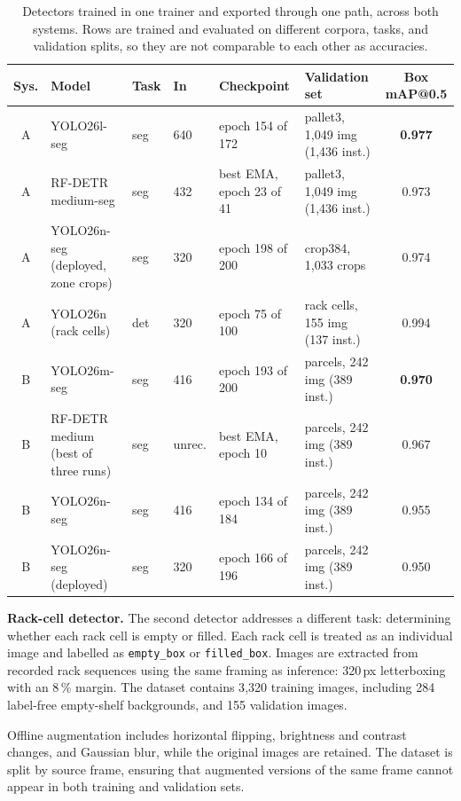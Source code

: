 \documentclass[9pt,a4paper,twocolumn]{rho-class/rho}
\begin{document}
\begin{table}[tbp]
    \caption{Detectors trained in one trainer and exported through one path, across both systems. Rows are trained and evaluated on different corpora, tasks, and validation splits, so they are not comparable to each other as accuracies.}
    \label{tab:detectors}
    \centering
    \footnotesize
    \setlength{\tabcolsep}{3pt}
    \begin{tabular}{clllllc}
    \toprule
    \textbf{Sys.} & \textbf{Model} & \textbf{Task} & \textbf{In} & \textbf{Checkpoint} & \textbf{Validation set} & \textbf{Box mAP@0.5} \\
    \midrule
    A & YOLO26l-seg & seg & 640 & epoch 154 of 172 & pallet3, 1{,}049 img (1{,}436 inst.) & \textbf{0.977} \\
    A & RF-DETR medium-seg & seg & 432 & best EMA, epoch 23 of 41 & pallet3, 1{,}049 img (1{,}436 inst.) & 0.973 \\
    A & YOLO26n-seg (deployed, zone crops) & seg & 320 & epoch 198 of 200 & crop384, 1{,}033 crops & 0.974 \\
    A & YOLO26n (rack cells) & det & 320 & epoch 75 of 100 & rack cells, 155 img (137 inst.) & 0.994 \\
    \midrule
    B & YOLO26m-seg & seg & 416 & epoch 193 of 200 & parcels, 242 img (389 inst.) & \textbf{0.970} \\
    B & RF-DETR medium (best of three runs) & seg & unrec. & best EMA, epoch 10 & parcels, 242 img (389 inst.) & 0.967 \\
    B & YOLO26n-seg & seg & 416 & epoch 134 of 184 & parcels, 242 img (389 inst.) & 0.955 \\
    B & YOLO26n-seg (deployed) & seg & 320 & epoch 166 of 196 & parcels, 242 img (389 inst.) & 0.950 \\
    \bottomrule
    \end{tabular}
\end{table}

\textbf{Rack-cell detector.} The second detector addresses a different task: determining whether each rack cell is empty or filled. Each rack cell is treated as an individual image and labelled as \texttt{empty\_box} or \texttt{filled\_box}. Images are extracted from recorded rack sequences using the same framing as inference: 320\,px letterboxing with an 8\,\% margin. The dataset contains 3{,}320 training images, including 284 label-free empty-shelf backgrounds, and 155 validation images.

Offline augmentation includes horizontal flipping, brightness and contrast changes, and Gaussian blur, while the original images are retained. The dataset is split by source frame, ensuring that augmented versions of the same frame cannot appear in both training and validation sets.
\end{document}
